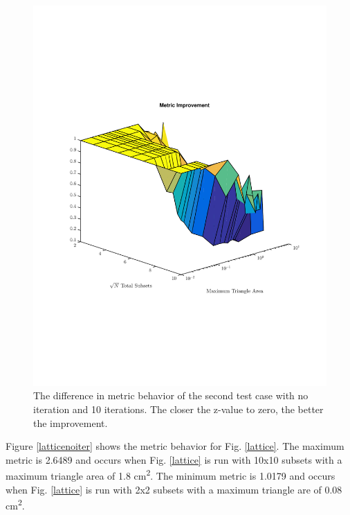 \documentclass{anstrans}
\begin{document}
\begin{figure}[H]
\centering
\includegraphics[scale=0.50, trim = 2cm 6cm 2cm 7cm,clip]{figures/SameDiff.pdf}
\caption{The difference in metric behavior of the second test case with no iteration and 10 iterations. The closer the z-value to zero, the better the improvement.}
\label{samediff}
\end{figure}

Figure \ref{latticenoiter} shows the metric behavior for Fig. \ref{lattice}. The maximum metric is 2.6489 and occurs when Fig. \ref{lattice} is run with 10x10 subsets with a maximum triangle area of 1.8 cm\textsuperscript{2}. The minimum metric is 1.0179 and occurs when Fig. \ref{lattice} is run with 2x2 subsets with a maximum triangle are of 0.08 cm\textsuperscript{2}.
\end{document}
